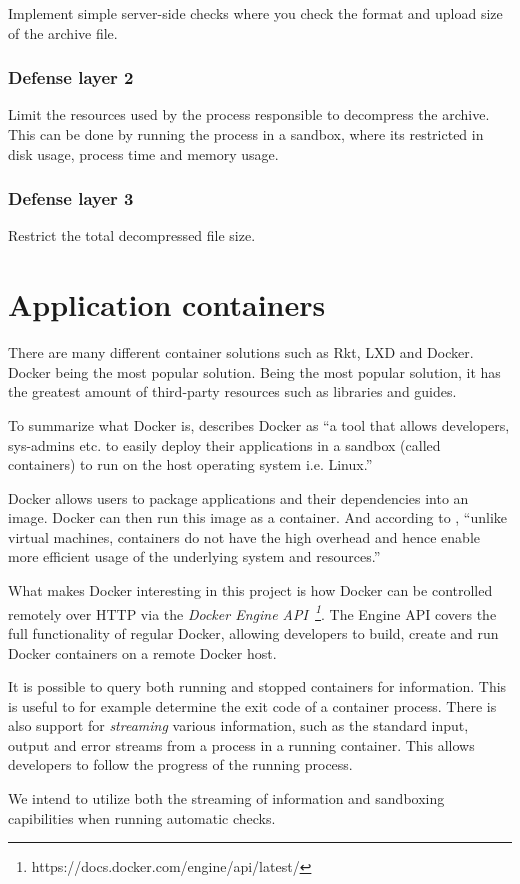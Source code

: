 Implement simple server-side checks where you check the format and upload size of the archive file.

\subsubsection*{Defense layer 2}
\label{defense_layer_2}

Limit the resources used by the process responsible to decompress the archive. This can be done by running the process in a sandbox, where its restricted in disk usage, process time and memory usage.

\subsubsection*{Defense layer 3}

Restrict the total decompressed file size.

\section{Application containers}

There are many different container solutions such as Rkt, LXD and Docker. Docker being the most popular solution. Being the most popular solution, it has the greatest amount of third-party resources such as libraries and guides.

To summarize what Docker is, \cite{2019ABeginners} describes Docker as ``a tool that allows developers, sys-admins etc. to easily deploy their applications in a sandbox (called containers) to run on the host operating system i.e. Linux.''

Docker allows users to package applications and their dependencies into an image. Docker can then run this image as a container. And according to \cite{2019ABeginners}, ``unlike virtual machines, containers do not have the high overhead and hence enable more efficient usage of the underlying system and resources.''


What makes Docker interesting in this project is how Docker can be controlled remotely over HTTP via the \emph{Docker Engine API~\footnote{https://docs.docker.com/engine/api/latest/}}. The Engine API covers the full functionality of regular Docker, allowing developers to build, create and run Docker containers on a remote Docker host. 

It is possible to query both running and stopped containers for information. This is useful to for example determine the exit code of a container process. There is also support for \textit{streaming} various information, such as the standard input, output and error streams from a process in a running container. This allows developers to follow the progress of the running process.

We intend to utilize both the streaming of information and sandboxing capibilities when running automatic checks.




